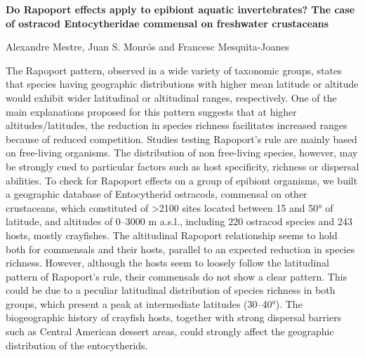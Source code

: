 \documentclass[11pt]{article}
\begin{document}
\textbf{Do Rapoport effects apply to epibiont aquatic invertebrates? The
case of ostracod Entocytheridae commensal on freshwater crustaceans}

Alexandre Mestre, Juan S. Monrós and Francesc Mesquita-Joanes

The Rapoport pattern, observed in a wide variety of taxonomic groups,
states that species having geographic distributions with higher mean
latitude or altitude would exhibit wider latitudinal or altitudinal
ranges, respectively. One of the main explanations proposed for this
pattern suggests that at higher altitudes/latitudes, the reduction in
species richness facilitates increased ranges because of reduced
competition. Studies testing Rapoport's rule are mainly based on
free-living organisms. The distribution of non free-living species,
however, may be strongly cued to particular factors such as host
specificity, richness or dispersal abilities. To check for Rapoport
effects on a group of epibiont organisms, we built a geographic database
of Entocytherid ostracods, commensal on other crustaceans, which
constituted of \textgreater{}2100 sites located between 15 and 50° of
latitude, and altitudes of 0–3000 m a.s.l., including 220 ostracod
species and 243 hosts, mostly crayfishes. The altitudinal Rapoport
relationship seems to hold both for commensals and their hosts, parallel
to an expected reduction in species richness. However, although the
hosts seem to loosely follow the latitudinal pattern of Rapoport's rule,
their commensals do not show a clear pattern. This could be due to a
peculiar latitudinal distribution of species richness in both groups,
which present a peak at intermediate latitudes (30–40°). The
biogeographic history of crayfish hosts, together with strong dispersal
barriers such as Central American dessert areas, could strongly affect
the geographic distribution of the entocytherids.
\end{document}
